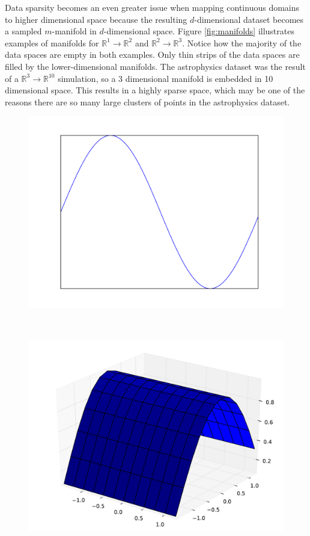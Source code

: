 Data sparsity becomes an even greater issue when mapping continuous domains to higher dimensional space because the resulting $d$-dimensional dataset becomes a sampled $m$-manifold in $d$-dimensional space. Figure \ref{fig:manifolds} illustrates examples of manifolds for $\mathbb{R}^1 \rightarrow \mathbb{R}^2$ and $\mathbb{R}^2 \rightarrow \mathbb{R}^3$. Notice how the majority of the data spaces are empty in both examples. Only thin strips of the data spaces are filled by the lower-dimensional manifolds. The astrophysics dataset was the result of a $\mathbb{R}^3 \rightarrow \mathbb{R}^{10}$ simulation, so a 3 dimensional manifold is embedded in 10 dimensional space. This results in a highly sparse space, which may be one of the reasons there are so many large clusters of points in the astrophysics dataset.

\begin{figure}
	\begin{center}
		\begin{subfloat}{%
			\includegraphics[scale=0.2]{figures/1d_manifold.pdf}
		}
		\end{subfloat}~
		\begin{subfloat}{%
			\includegraphics[scale=0.225]{figures/2d_manifold.pdf}
		}
		\end{subfloat}
	\end{center}


\end{figure}
